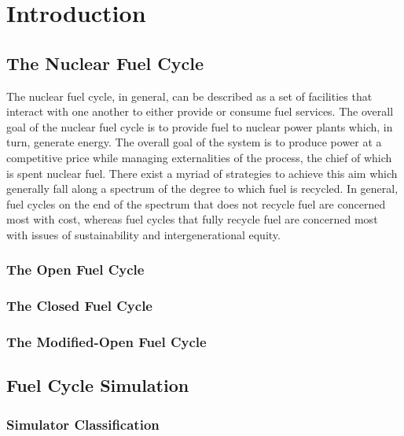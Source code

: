 \chapter{Introduction}\label{ch:intro}

\section{The Nuclear Fuel Cycle}

The nuclear fuel cycle, in general, can be described as a set of facilities that
interact with one another to either provide or consume fuel services. The
overall goal of the nuclear fuel cycle is to provide fuel to nuclear power
plants which, in turn, generate energy. The overall goal of the system is to
produce power at a competitive price while managing externalities of the
process, the chief of which is spent nuclear fuel. There exist a myriad of
strategies to achieve this aim which generally fall along a spectrum of the
degree to which fuel is recycled. In general, fuel cycles on the end of the
spectrum that does not recycle fuel are concerned most with cost, whereas fuel
cycles that fully recycle fuel are concerned most with issues of sustainability
and intergenerational equity.

\subsection{The Open Fuel Cycle}


\subsection{The Closed Fuel Cycle}


\subsection{The Modified-Open Fuel Cycle}


\section{Fuel Cycle Simulation}

\subsection{Simulator Classification}

